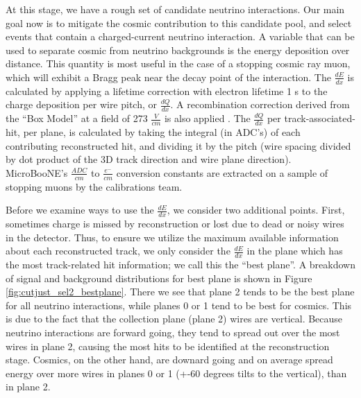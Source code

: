 \par At this stage, we have a rough set of candidate neutrino interactions. Our main goal now is to mitigate the cosmic contribution to this candidate pool, and select events that contain a charged-current neutrino interaction. A variable that can be used to separate cosmic from neutrino backgrounds is the energy deposition over distance.  This quantity is most useful in the case of a stopping cosmic ray muon, which will exhibit a Bragg peak near the decay point of the interaction.  The $\frac{dE}{dx}$ is calculated by applying a lifetime correction with electron lifetime 1 s to the charge deposition per wire pitch, or $\frac{dQ}{dx}$. A recombination correction derived from the ``Box Model'' at a field of 273 $\frac{V}{cm}$ is also applied \cite{bib:argoneut_recomb}. The $\frac{dQ}{dx}$ per track-associated-hit, per plane, is calculated by taking the integral (in ADC's) of each contributing reconstructed hit, and dividing it by the pitch (wire spacing divided by dot product of the 3D track direction and wire plane direction). MicroBooNE's $\frac{ADC}{cm}$ to $\frac{e^-}{cm}$ conversion constants are extracted on a sample of stopping muons by the calibrations team.
\par Before we examine ways to use the $\frac{dE}{dx}$, we consider two additional points. First, sometimes charge is missed by reconstruction or lost due to dead or noisy wires in the detector. Thus, to ensure we utilize the maximum available information about each reconstructed track, we only consider the $\frac{dE}{dx}$ in the plane which has the most track-related hit information; we call this the ``best plane''. A breakdown of signal and background distributions for best plane is shown in Figure \ref{fig:cutjust_sel2_bestplane}. There we see that plane 2 tends to be the best plane for all neutrino interactions, while planes 0 or 1 tend to be best for cosmics.  This is due to the fact that the collection plane (plane 2) wires are vertical.  Because neutrino interactions are forward going, they tend to spread out over the most wires in plane 2, causing the most hits to be identified at the reconstruction stage. Cosmics, on the other hand, are downard going and on average spread energy over more wires in planes 0 or 1 (+-60 degrees tilts to the vertical), than in plane 2.

